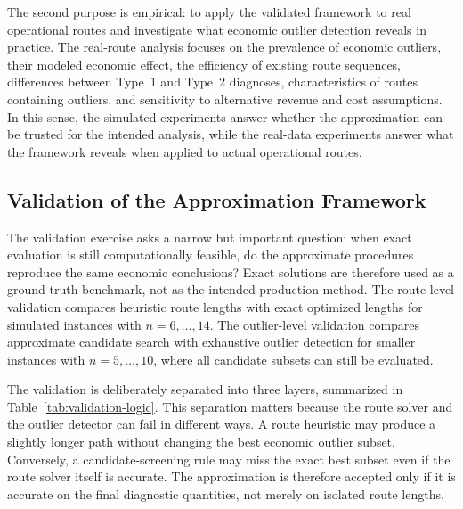 \documentclass[preprint,12pt]{elsarticle}
\begin{document}
The second purpose is empirical: to apply the validated framework to real operational routes and investigate what economic outlier detection reveals in practice. The real-route analysis focuses on the prevalence of economic outliers, their modeled economic effect, the efficiency of existing route sequences, differences between Type~1 and Type~2 diagnoses, characteristics of routes containing outliers, and sensitivity to alternative revenue and cost assumptions. In this sense, the simulated experiments answer whether the approximation can be trusted for the intended analysis, while the real-data experiments answer what the framework reveals when applied to actual operational routes.

\subsection{Validation of the Approximation Framework}
\label{subsec:validation-of-the-approximation-framework}

The validation exercise asks a narrow but important question: when exact evaluation is still computationally feasible, do the approximate procedures reproduce the same economic conclusions? Exact solutions are therefore used as a ground-truth benchmark, not as the intended production method. The route-level validation compares heuristic route lengths with exact optimized lengths for simulated instances with $n=6,\ldots,14$. The outlier-level validation compares approximate candidate search with exhaustive outlier detection for smaller instances with $n=5,\ldots,10$, where all candidate subsets can still be evaluated.

The validation is deliberately separated into three layers, summarized in Table~\ref{tab:validation-logic}. This separation matters because the route solver and the outlier detector can fail in different ways. A route heuristic may produce a slightly longer path without changing the best economic outlier subset. Conversely, a candidate-screening rule may miss the exact best subset even if the route solver itself is accurate. The approximation is therefore accepted only if it is accurate on the final diagnostic quantities, not merely on isolated route lengths.
\end{document}
